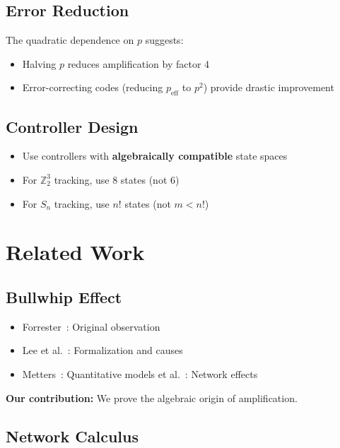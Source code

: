 \documentclass[11pt]{article}
\begin{document}
\subsection{Error Reduction}

The quadratic dependence on $p$ suggests:
\begin{itemize}
    \item Halving $p$ reduces amplification by factor 4
    \item Error-correcting codes (reducing $p_{\text{eff}}$ to $p^2$) provide drastic improvement
\end{itemize}

\subsection{Controller Design}

\begin{itemize}
    \item Use controllers with \textbf{algebraically compatible} state spaces
    \item For $\mathbb{Z}_2^3$ tracking, use 8 states (not 6)
    \item For $S_n$ tracking, use $n!$ states (not $m < n!$)
\end{itemize}

\section{Related Work}

\subsection{Bullwhip Effect}

\begin{itemize}
    \item Forrester~\cite{forrester1958industrial}: Original observation
    \item Lee et al.~\cite{lee1997bullwhip}: Formalization and causes
    \item Metters~\cite{metters1997bullwhip}: Quantitative models
     et al.~\cite{osadchiy2021bullwhip}: Network effects
\end{itemize}

\textbf{Our contribution:} We prove the algebraic origin of amplification.

\subsection{Network Calculus}
\end{document}
